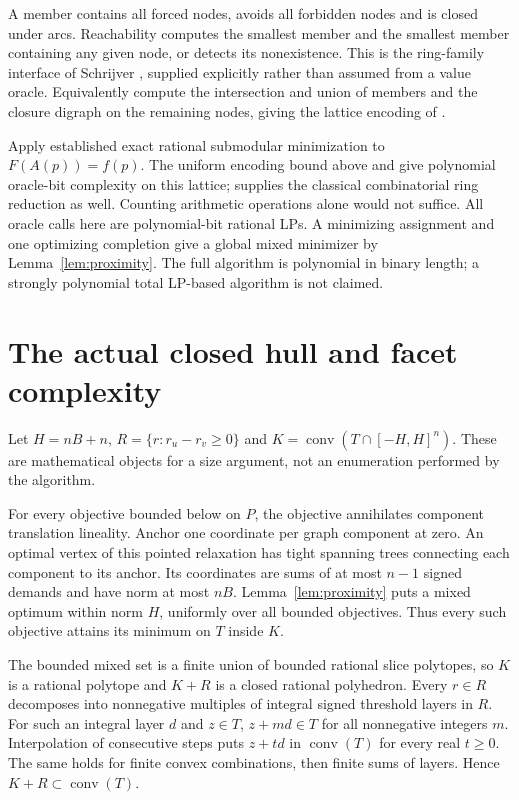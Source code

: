 \documentclass[11pt]{article}
\newcommand{\conv}{\operatorname{conv}}
\begin{document}
A member contains all forced nodes, avoids all forbidden nodes and is closed
under arcs. Reachability computes the smallest member and the smallest member
containing any given node, or detects its nonexistence. This is the ring-family
interface of Schrijver \cite[\S6]{Schrijver}, supplied explicitly rather than
assumed from a value oracle. Equivalently compute the intersection and union
of members and the closure digraph on the remaining nodes, giving the lattice
encoding of \cite[\S10.3]{GLS}.

Apply established exact rational submodular minimization to
$F(A(p))=f(p)$. The uniform encoding bound above and
\cite[Theorem~10.2.7, problem~10.3.8 and its reduction]{GLS} give polynomial
oracle-bit complexity on this lattice; \cite[\S6]{Schrijver} supplies the
classical combinatorial ring reduction as well. Counting arithmetic operations
alone would not suffice. All oracle calls here are polynomial-bit rational LPs.
A minimizing assignment and one optimizing completion give a global mixed
minimizer by Lemma~\ref{lem:proximity}. The full algorithm is polynomial in
binary length; a strongly polynomial total LP-based algorithm is not claimed.

\section{The actual closed hull and facet complexity}
Let $H=nB+n$, $R=\{r:r_u-r_v\ge0\}$ and
$K=\conv(T\cap[-H,H]^n)$. These are mathematical objects for a size argument,
not an enumeration performed by the algorithm.

For every objective bounded below on $P$, the objective annihilates component
translation lineality. Anchor one coordinate per graph component at zero.
An optimal vertex of this pointed relaxation has tight spanning trees
connecting each component to its anchor. Its coordinates are sums of at most
$n-1$ signed demands and have norm at most $nB$. Lemma~\ref{lem:proximity}
puts a mixed optimum within norm $H$, uniformly over all bounded objectives.
Thus every such objective attains its minimum on $T$ inside $K$.

The bounded mixed set is a finite union of bounded rational slice polytopes,
so $K$ is a rational polytope and $K+R$ is a closed rational polyhedron.
Every $r\in R$ decomposes into nonnegative multiples of integral signed
threshold layers in $R$. For such an integral layer $d$ and $z\in T$,
$z+md\in T$ for all nonnegative integers $m$. Interpolation of consecutive
steps puts $z+td$ in $\conv(T)$ for every real $t\ge0$. The same holds for
finite convex combinations, then finite sums of layers. Hence $K+R\subset
\conv(T)$.
\end{document}
